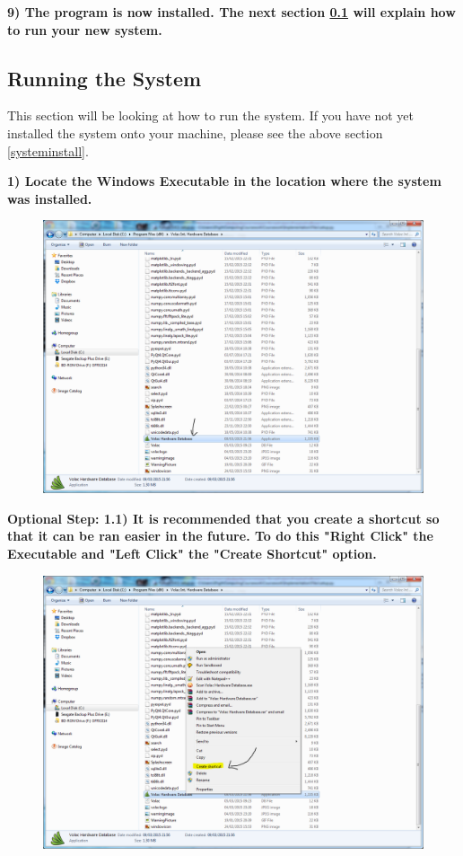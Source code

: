 \textbf{9) The program is now installed. The next section \ref{runprogram} will explain how to run your new system.}

\subsection{Running the System}\label{runprogram}

This section will be looking at how to run the system. If you have not yet installed the system onto your machine, please see the above section \ref{systeminstall}.

\newpage

\textbf{1) Locate the Windows Executable in the location where the system was installed.}

\begin{figure}[H]
    \includegraphics[width=\textwidth]{./Manual/Images/run1.png}
\end{figure}

\newpage

\textbf{Optional Step: 1.1) It is recommended that you create a shortcut so that it can be ran easier in the future. To do this "Right Click" the Executable and "Left Click" the "Create Shortcut" option.}

\begin{figure}[H]
    \includegraphics[width=\textwidth]{./Manual/Images/run2.png}
\end{figure}


